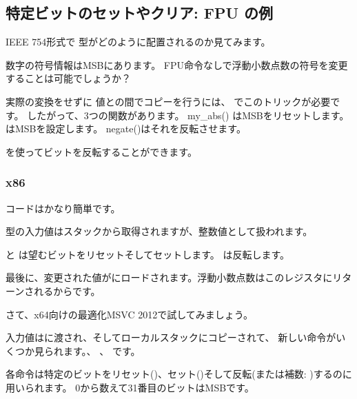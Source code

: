 ﻿\subsection{特定ビットのセットやクリア: \ac{FPU} の例}


IEEE 754形式で \Tfloat 型がどのように配置されるのか見てみます。



数字の符号情報は\ac{MSB}にあります。
FPU命令なしで浮動小数点数の符号を変更することは可能でしょうか？



実際の変換をせずに \Tfloat 値との間でコピーを行うには、 \CCpp でこのトリックが必要です。 
したがって、3つの関数があります。 my\_abs() は\ac{MSB}をリセットします。 は\ac{MSB}を設定します。 negate()はそれを反転させます。

\XOR を使ってビットを反転することができます。

\subsubsection{x86}

コードはかなり簡単です。



\Tfloat 型の入力値はスタックから取得されますが、整数値として扱われます。

\AND と \OR は望むビットをリセットそしてセットします。
\XOR は反転します。

最後に、変更された値がにロードされます。浮動小数点数はこのレジスタにリターンされるからです。

さて、x64向けの最適化MSVC 2012で試してみましょう。




入力値はに渡され、そしてローカルスタックにコピーされて、
新しい命令がいくつか見られます。\BTR 、 \BTS 、 \BTC です。

各命令は特定のビットをリセット(\BTR)、セット(\BTS)そして反転(または補数: \BTC)するのに用いられます。
0から数えて31番目のビットは\ac{MSB}です。


